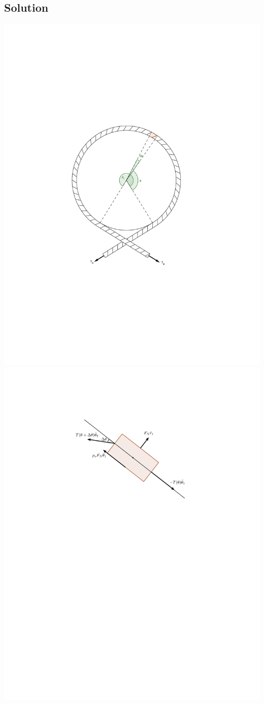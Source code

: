 \documentclass[solutions]{esg8012pset}
\begin{document}
\subsection{Solution}
  \begin{center} \includegraphics[width=.33\textwidth]{2009-10-02_Diagram_1_1}\includegraphics[width=.5\textwidth]{2009-10-02_Diagram_1_2}\end{center}
\end{document}
